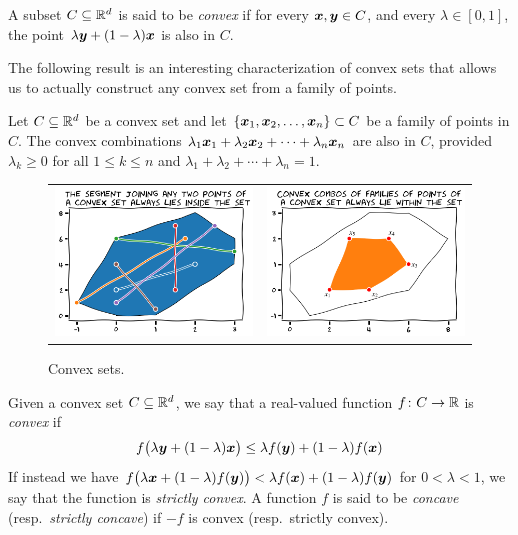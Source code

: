 \begin{definition}\label{def:convexSets}
A subset $C \subseteq \mathbb{R}^d$ is said to be \emph{convex} if for every $\boldsymbol{x}, \boldsymbol{y} \in C$, and every $\lambda \in [0,1]$, the point $\lambda \boldsymbol{y} + (1-\lambda) \boldsymbol{x}$ is also in $C$.
\end{definition}

\separator 

The following result is an interesting characterization of convex sets that allows us to actually construct any convex set from a family of points.
\begin{theorem}
Let $C\subseteq \mathbb{R}^d$ be a convex set and let $\{ \boldsymbol{x}_1, \boldsymbol{x}_2, \dotsc, \boldsymbol{x}_n \} \subset C$ be a family of points in $C$.  The convex combinations $\lambda_1 \boldsymbol{x}_1 + \lambda_2 \boldsymbol{x}_2 + \dotsb + \lambda_n \boldsymbol{x}_n$ are also in $C$, provided $\lambda_k\geq 0$ for all $1\leq k \leq n$ and $\lambda_1 + \lambda_2 + \dotsb + \lambda_n = 1$.
\end{theorem}

\begin{figure}[ht!]
\begin{tabular}{cc}
\includegraphics[width=0.48\linewidth]{images/convexSet1.png} &
\includegraphics[width=0.48\linewidth]{images/convexSet2.png}
\end{tabular}
\caption{Convex sets.}
\label{figure:convexSet}
\end{figure}

\begin{definition}\label{def:ConvexFunctions}
Given a convex set $C \subseteq \mathbb{R}^d$, we say that a real-valued function $f \colon C \to \mathbb{R}$ is \emph{convex} if 
\begin{equation*}
f\big(\lambda \boldsymbol{y} + (1-\lambda)\boldsymbol{x} \big) \leq \lambda f(\boldsymbol{y}) + (1-\lambda) f(\boldsymbol{x})
\end{equation*}
If instead we have $f\big(\lambda \boldsymbol{x} + (1-\lambda)f(\boldsymbol{y})\big) < \lambda f(\boldsymbol{x}) + (1-\lambda) f(\boldsymbol{y})$ for $0<\lambda<1$, we say that the function is \emph{strictly convex}.  A function $f$ is said to be \emph{concave} (resp.~\emph{strictly concave}) if $-f$ is convex (resp.~strictly convex).
\end{definition}

